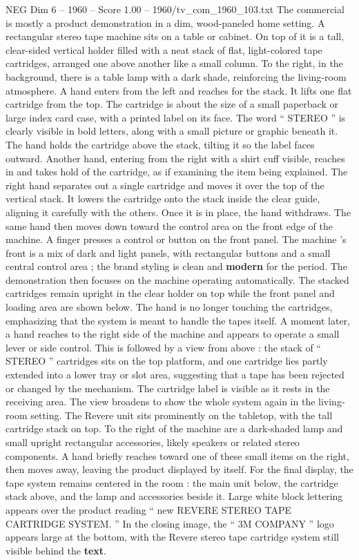 \begin{textsample}{NEG Dim 6 – 1960 – Score 1.00 – 1960/tv\_com\_1960\_103.txt}  \label{ex:f6_neg_079}
The commercial is mostly a product demonstration in a dim, wood-paneled home setting.
A rectangular stereo tape machine sits on a table or cabinet.
On top of it is a tall, clear-sided vertical holder filled with a neat stack of flat, light-colored tape cartridges, arranged one above another like a small column.
To the right, in the background, there is a table lamp with a dark shade, reinforcing the living-room atmosphere.
A hand enters from the left and reaches for the stack.
It lifts one flat cartridge from the top.
The cartridge is about the size of a small paperback or large index card case, with a printed label on its face.
The word “ STEREO ” is clearly visible in bold letters, along with a small picture or graphic beneath it.
The hand holds the cartridge above the stack, tilting it so the label faces outward.
Another hand, entering from the right with a shirt cuff visible, reaches in and takes hold of the cartridge, as if examining the item being explained.
The right hand separates out a single cartridge and moves it over the top of the vertical stack.
It lowers the cartridge onto the stack inside the clear guide, aligning it carefully with the others.
Once it is in place, the hand withdraws.
The same hand then moves down toward the control area on the front edge of the machine.
A finger presses a control or button on the front panel.
The machine ’s front is a mix of dark and light panels, with rectangular buttons and a small central control area ; the brand styling is clean and \textbf{modern} for the period.
The demonstration then focuses on the machine operating automatically.
The stacked cartridges remain upright in the clear holder on top while the front panel and loading area are shown below.
The hand is no longer touching the cartridges, emphasizing that the system is meant to handle the tapes itself.
A moment later, a hand reaches to the right side of the machine and appears to operate a small lever or side control.
This is followed by a view from above : the stack of “ STEREO ” cartridges sits on the top platform, and one cartridge lies partly extended into a lower tray or slot area, suggesting that a tape has been rejected or changed by the mechanism.
The cartridge label is visible as it rests in the receiving area.
The view broadens to show the whole system again in the living-room setting.
The Revere unit sits prominently on the tabletop, with the tall cartridge stack on top.
To the right of the machine are a dark-shaded lamp and small upright rectangular accessories, likely speakers or related stereo components.
A hand briefly reaches toward one of these small items on the right, then moves away, leaving the product displayed by itself.
For the final display, the tape system remains centered in the room : the main unit below, the cartridge stack above, and the lamp and accessories beside it.
Large white block lettering appears over the product reading “ new REVERE STEREO TAPE CARTRIDGE SYSTEM. ” In the closing image, the “ 3M COMPANY ” logo appears large at the bottom, with the Revere stereo tape cartridge system still visible behind the \textbf{text}.

\end{textsample}

